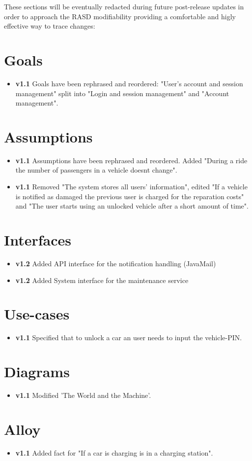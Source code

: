 These sections will be eventually redacted during future post-release updates in order to approach the RASD modifiability providing a comfortable and higly effective way to trace changes:

\section{Goals}
	\begin{itemize}
		\item \textbf{v1.1} Goals have been rephrased and reordered: "User’s account and session management" split into "Login and session management" and "Account management".
	\end{itemize}
\section{Assumptions}
	\begin{itemize}
		\item \textbf{v1.1} Assumptions have been rephrased and reordered. Added "During a ride the number of passengers in a vehicle doesnt change".
		\item \textbf{v1.1} Removed "The system stores all users' information", edited "If a vehicle is notified as damaged the previous user is charged for the reparation costs" and "The user starts using an unlocked vehicle after a short amount of time".
	\end{itemize}
\section{Interfaces}
	\begin{itemize}
		\item \textbf{v1.2} Added API interface for the notification handling (JavaMail)
		\item \textbf{v1.2} Added System interface for the maintenance service
	\end{itemize}
\section{Use-cases}
	\begin{itemize}
		\item \textbf{v1.1} Specified that to unlock a car an user needs to input the vehicle-PIN.
	\end{itemize}
\section{Diagrams}
	\begin{itemize}
		\item \textbf{v1.1} Modified 'The World and the Machine'.
	\end{itemize}
\section{Alloy}
	\begin{itemize}
		\item \textbf{v1.1} Added fact for "If a car is charging is in a charging station".
	\end{itemize}